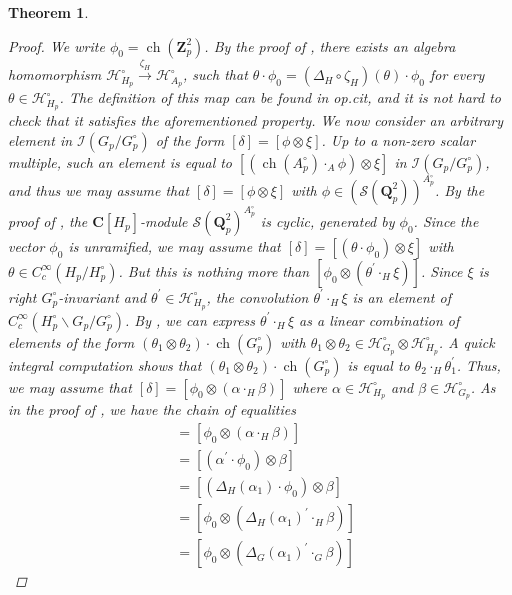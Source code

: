 \documentclass{amsart}%
\theoremstyle{plain}
\newtheorem{thm}{Theorem}[subsection]
\theoremstyle{plain}
\theoremstyle{remark}
\DeclareMathOperator{\ch}{ch}
\begin{document}
\begin{thm}
\begin{proof}
        We write $\phi_0=\ch(\mathbf{Z}_p^2)$. By the proof of \cite[Lemma $4.3.3$]{Loeffler_2021}, there exists an algebra homomorphism $\mathcal{H}_{H_p}^\circ\overset{\zeta_H}{\longrightarrow} \mathcal{H}_{A_p}^\circ$, such that $\theta\cdot \phi_0=(\Delta_H\circ \zeta_H)(\theta)\cdot \phi_0$ for every $\theta\in\mathcal{H}_{H_p}^\circ$. The definition of this map can be found in \textit{op.cit}, and it is not hard to check that it satisfies the aforementioned property. We now consider an arbitrary element in $\mathcal{I}(G_p/G_p^\circ)$ of the form $[\delta]=[\phi\otimes \xi]$. Up to a non-zero scalar multiple, such an element is equal to $[(\ch(A_p^\circ)\cdot_A \phi)\otimes \xi]$ in $\mathcal{I}(G_p/G_p^\circ)$, and thus we may assume that $[\delta]=[\phi\otimes \xi]$ with $\phi\in (\mathcal{S}(\mathbf{Q}_p^2))^{A_p^\circ}$. By the proof of \cite[Proposition $4.3.4$]{Loeffler_2021}, the $\mathbf{C}[H_p]$-module $\mathcal{S}(\mathbf{Q}_p^2)^{A_p^\circ}$ is cyclic, generated by $\phi_0$. Since the vector $\phi_0$ is unramified, we may assume that $[\delta]=[(\theta\cdot\phi_0)\otimes \xi]$ with $\theta\in C_c^\infty(H_p/H_p^\circ)$. But this is nothing more than $[\phi_0\otimes (\theta^{'}\cdot_H \xi)]$. Since $\xi$ is right $G_p^\circ$-invariant and $\theta^{'}\in \mathcal{H}_{H_p}^\circ$, the convolution $\theta^{'}\cdot_H\xi$ is an element of $C_c^\infty(H_p^\circ\backslash G_p/G_p^\circ)$. By , we can express $\theta^{'}\cdot_H \xi$ as a linear combination of elements of the form $(\theta_1\otimes \theta_2)\cdot \ch(G_p^\circ)$ with $\theta_1\otimes \theta_2\in \mathcal{H}_{G_p}^\circ\otimes \mathcal{H}_{H_p}^\circ$. A quick integral computation shows that $(\theta_1\otimes \theta_2)\cdot \ch(G_p^\circ)$ is equal to $\theta_2\cdot_H \theta_1^{'}$. Thus, we may assume that $[\delta]=[\phi_0\otimes(\alpha\cdot_H \beta)]$ where $\alpha\in\mathcal{H}_{H_p}^\circ$ and $\beta\in\mathcal{H}_{G_p}^\circ$. As in the proof of \cite[ Theorem $4.3.6$]{Loeffler_2021}, we have the chain of equalities
        \begin{align*}
            [\delta]&=[\phi_0\otimes (\alpha\cdot_H\beta)]\\
            &=[(\alpha^{'}\cdot \phi_0)\otimes \beta]\\
            &=[(\Delta_H(\alpha_1)\cdot \phi_0)\otimes \beta]\\
            &=[\phi_0\otimes (\Delta_H(\alpha_1)^{'} \cdot_H \beta)]\\
            &=[\phi_0\otimes (\Delta_G(\alpha_1)^{'} \cdot_G \beta)]

\end{align*}
\end{proof}
\end{thm}
\end{document}
